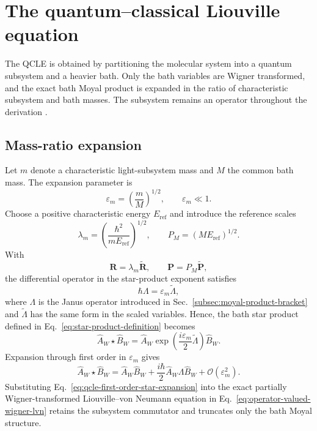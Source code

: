 \documentclass[
  11pt,
  letterpaper,
  onehalfspacing,
  normalmargins,
  equalmargins,
  oneside
]{ut-thesis}
\begin{document}
\section{The quantum--classical Liouville equation}
\label{sec:qcle-limit}

The QCLE is obtained by partitioning the molecular system into a quantum
subsystem and a heavier bath. Only the bath variables are Wigner transformed,
and the exact bath Moyal product is expanded in the ratio of characteristic
subsystem and bath masses. The subsystem remains an operator throughout the
derivation \cite{KapralCiccotti1999JCP,Kapral2006ARPC}.


\subsection{Mass-ratio expansion}
\label{subsec:mass-ratio-scaling-qcle}

Let \(m\) denote a characteristic light-subsystem mass and \(M\) the common
bath mass. The expansion parameter is
\begin{equation}
\varepsilon_m
=
\left(
\frac{m}{M}
\right)^{1/2},
\qquad
\varepsilon_m\ll1.
\label{eq:qcle-mass-ratio-parameter}
\end{equation}
Choose a positive characteristic energy \(E_{\mathrm{ref}}\) and introduce the reference scales
\begin{equation}
\lambda_m
=
\left(
\frac{\hbar^2}{mE_{\mathrm{ref}}}
\right)^{1/2},
\qquad
P_M
=
\left(
ME_{\mathrm{ref}}
\right)^{1/2}.
\label{eq:qcle-coordinate-momentum-scales}
\end{equation}
With
\begin{equation}
\mathbf R=\lambda_m\widetilde{\mathbf R},
\qquad
\mathbf P=P_M\widetilde{\mathbf P},
\label{eq:qcle-scaled-bath-variables}
\end{equation}
the differential operator in the star-product exponent satisfies
\begin{equation}
\hbar\Lambda
=
\varepsilon_m\widetilde\Lambda,
\label{eq:qcle-scaled-janus-relation}
\end{equation}
where \(\Lambda\) is the Janus operator introduced in
Sec.~\ref{subsec:moyal-product-bracket} and
\(\widetilde\Lambda\) has the same form in the scaled variables. Hence, the
bath star product defined in Eq.~\eqref{eq:star-product-definition} becomes
\begin{equation}
\hat A_W\star\hat B_W
=
\hat A_W
\exp\left(
\frac{i\varepsilon_m}{2}\widetilde\Lambda
\right)
\hat B_W.
\label{eq:qcle-scaled-star-product}
\end{equation}
Expansion through first order in \(\varepsilon_m\) gives
\begin{equation}
\hat A_W\star\hat B_W
=
\hat A_W\hat B_W
+
\frac{i\hbar}{2}
\hat A_W\Lambda\hat B_W
+
\mathcal O(\varepsilon_m^2).
\label{eq:qcle-first-order-star-expansion}
\end{equation}
Substituting Eq.~\eqref{eq:qcle-first-order-star-expansion} into the exact
partially Wigner-transformed Liouville--von Neumann equation in
Eq.~\eqref{eq:operator-valued-wigner-lvn} retains the subsystem commutator
and truncates only the bath Moyal structure.
\end{document}
